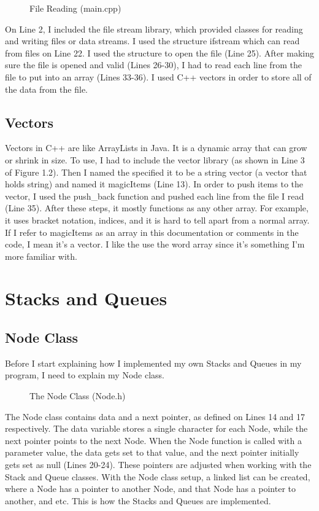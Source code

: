 \documentclass[letterpaper, 10pt]{article}
\begin{document}
\begin{figure}[H]
  \centering
   
  \caption{File Reading (main.cpp)}
  \label{fig:figure1.2_part2}
\end{figure}
\noindent
On Line 2, I included the file stream library, which provided classes for reading and writing files or data streams. I used the structure ifstream which can read from files on Line 22. I used the structure to open the file (Line 25). After making sure the file is opened and valid (Lines 26-30), I had to read each line from the file to put into an array (Lines 33-36). I used C++ vectors in order to store all of the data from the file. 

\subsection{Vectors}
\noindent
Vectors in C++ are like ArrayLists in Java. It is a dynamic array that can grow or shrink in size. To use, I had to include the vector library (as shown in Line 3 of Figure 1.2). Then I named the specified it to be a string vector (a vector that holds string) and named it magicItems (Line 13). In order to push items to the vector, I used the push\_back function and pushed each line from the file I read (Line 35). After these steps, it mostly functions as any other array. For example, it uses bracket notation, indices, and it is hard to tell apart from a normal array. If I refer to magicItems as an array in this documentation or comments in the code, I mean it's a vector. I like the use the word array since it's something I'm more familiar with.

\section{Stacks and Queues}
\setcounter{figure}{0} %

\subsection{Node Class}
\noindent
Before I start explaining how I implemented my own Stacks and Queues in my program, I need to explain my Node class. 
\begin{figure}[H]
  \centering
   
  \caption{The Node Class (Node.h)}
  \label{fig:figure2.1}
\end{figure}
\noindent
The Node class contains data and a next pointer, as defined on Lines 14 and 17 respectively. The data variable stores a single character for each Node, while the next pointer points to the next Node. When the Node function is called with a parameter value, the data gets set to that value, and the next pointer initially gets set as null (Lines 20-24). These pointers are adjusted when working with the Stack and Queue classes. With the Node class setup, a linked list can be created, where a Node has a pointer to another Node, and that Node has a pointer to another, and etc. This is how the Stacks and Queues are implemented. 
\end{document}
